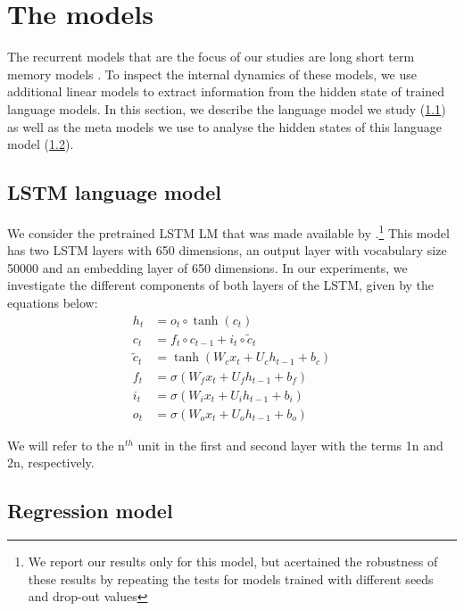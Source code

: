 
\section{The models}

The recurrent models that are the focus of our studies are long short term memory models \cite[LSTMs]{Hochreiter:Schmidhuber:1997}.
To inspect the internal dynamics of these models, we use additional linear models to extract information from the hidden state of trained language models.
In this section, we describe the language model we study (\ref{ssec:lstm_lm}) as well as the meta models we use to analyse the hidden states of this language model (\ref{ssec:dc}).

\subsection{LSTM language model}\label{ssec:lstm_lm}

We consider the pretrained LSTM LM that was made available by \cite{Gulordava:etal:2018}.\footnote{We report our results only for this model, but acertained the robustness of these results by repeating the tests for models trained with different seeds and drop-out values}
This model has two LSTM layers with 650 dimensions, an output layer with vocabulary size 50000 and an embedding layer of 650 dimensions.
In our experiments, we investigate the different components of both layers of the LSTM, given by the equations below:
\begin{align}
    h_t & = o_t\circ \tanh(c_t)\\ 
     c_t & = f_t\circ c_{t-1} + i_t\circ \widetilde{c}_t\\
     \widetilde{c}_t & = \tanh(W_cx_t + U_ch_{t-1} + b_c)\\
     f_t & = \sigma(W_fx_t + U_fh_{t-1} + b_f) \\
     i_t & = \sigma(W_ix_t + U_ih_{t-1} + b_i) \\
     o_t & = \sigma(W_ox_t + U_oh_{t-1} + b_o)
\end{align}

We will refer to the n$^{th}$ unit in the first and second layer with the terms \unit{1}{n} and \unit{2}{n}, respectively.


\subsection{Regression model}\label{ssec:dc}

